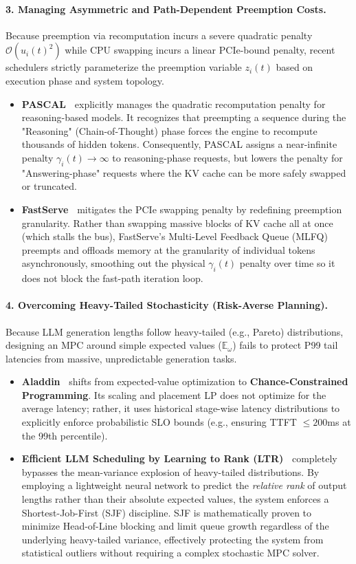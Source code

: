 \documentclass[11pt]{article}
\begin{document}
\paragraph{3. Managing Asymmetric and Path-Dependent Preemption Costs.}
Because preemption via recomputation incurs a severe quadratic penalty $\mathcal{O}(u_i(t)^2)$ while CPU swapping incurs a linear PCIe-bound penalty, recent schedulers strictly parameterize the preemption variable $z_i(t)$ based on execution phase and system topology.
\begin{itemize}
    \item \textbf{PASCAL~\citep{cho2026pascal}} explicitly manages the quadratic recomputation penalty for reasoning-based models. It recognizes that preempting a sequence during the "Reasoning" (Chain-of-Thought) phase forces the engine to recompute thousands of hidden tokens. Consequently, PASCAL assigns a near-infinite penalty $\gamma_{i}(t) \to \infty$ to reasoning-phase requests, but lowers the penalty for "Answering-phase" requests where the KV cache can be more safely swapped or truncated.
    \item \textbf{FastServe~\citep{hidayetoglu2026shift}} mitigates the PCIe swapping penalty by redefining preemption granularity. Rather than swapping massive blocks of KV cache all at once (which stalls the bus), FastServe's Multi-Level Feedback Queue (MLFQ) preempts and offloads memory at the granularity of individual tokens asynchronously, smoothing out the physical $\gamma_i(t)$ penalty over time so it does not block the fast-path iteration loop.
\end{itemize}

\paragraph{4. Overcoming Heavy-Tailed Stochasticity (Risk-Averse Planning).}
Because LLM generation lengths follow heavy-tailed (e.g., Pareto) distributions, designing an MPC around simple expected values ($\mathbb{E}_{\omega}$) fails to protect P99 tail latencies from massive, unpredictable generation tasks.
\begin{itemize}
    \item \textbf{Aladdin~\citep{nie2024aladdin}} shifts from expected-value optimization to \textbf{Chance-Constrained Programming}. Its scaling and placement LP does not optimize for the average latency; rather, it uses historical stage-wise latency distributions to explicitly enforce probabilistic SLO bounds (e.g., ensuring TTFT $\le 200$ms at the 99th percentile). 
    \item \textbf{Efficient LLM Scheduling by Learning to Rank (LTR)~\citep{fu2024efficient}} completely bypasses the mean-variance explosion of heavy-tailed distributions. By employing a lightweight neural network to predict the \textit{relative rank} of output lengths rather than their absolute expected values, the system enforces a Shortest-Job-First (SJF) discipline. SJF is mathematically proven to minimize Head-of-Line blocking and limit queue growth regardless of the underlying heavy-tailed variance, effectively protecting the system from statistical outliers without requiring a complex stochastic MPC solver.
\end{itemize}
\end{document}
